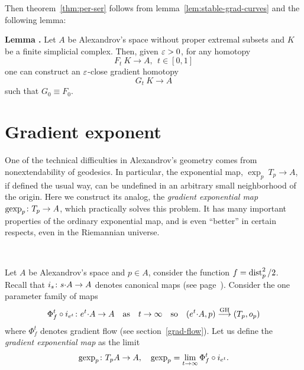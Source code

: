 \documentclass{article}
\begin{document}
Then theorem~\ref{thm:per-ser} follows from lemma~\ref{lem:stable-grad-curves} and the following lemma:

\begin{thm}{\bf Lemma \cite{petrunin:grad-hom}.}\label{lem:hom-approx} Let $A$ be Alexandrov's space without proper extremal subsets and $K$ be a finite simplicial complex. 
Then, given $\varepsilon>0$, for any  homotopy 
$$F_t\:K\to A,\ \ t\in [0,1]$$ one can construct an $\varepsilon$-close gradient homotopy 
$$G_t\:K\to A$$ such that $G_0\equiv F_0$.
\end{thm}















\section{Gradient exponent}\label{gexp}

\addtocounter{subsection}{1}
\setcounter{thm}{0}

One of the technical difficulties in Alexandrov's geometry comes from
nonextendability of geodesics. 
In particular, the exponential map, $\exp_p\:T_p\to A$, if defined the usual way, can
be undefined in an arbitrary small neighborhood of the origin. 
Here we construct its analog, the \emph{gradient exponential map} $\operatorname{gexp}_p\colon T_p\to
A$, which practically solves this problem. 
It has many important properties of the ordinary exponential map, and is even
``better'' in certain respects,
even in the Riemannian universe.

\ 

Let $A$ be Alexandrov's space and $p\in A$, consider the function $f\z=\dist_p^2/2$.
Recall that $i_{s}\colon s{\cdot} A\to A$ denotes canonical maps (see
page~\pageref{tangent-def2}). 
Consider the one parameter family of maps
$$\Phi^t_{f}\circ i_{e^t}\:e^t{\cdot} A\to A\ \ \ \text{as}\ \ \ t\to\infty \ \ \
\text{so}\ \ \ (e^t{\cdot} A,p)\GHto (T_p,o_p)$$
where $\Phi^t_{f}$ denotes gradient flow (see section~\ref{grad-flow}). 
Let us define the \textit{gradient exponential map} as the limit
$$\gexp_p\:T_p A\to A,\ \ \  \gexp_p=\lim_{t\to\infty}\Phi^t_{f}\circ i_{e^t}.$$
\end{document}
